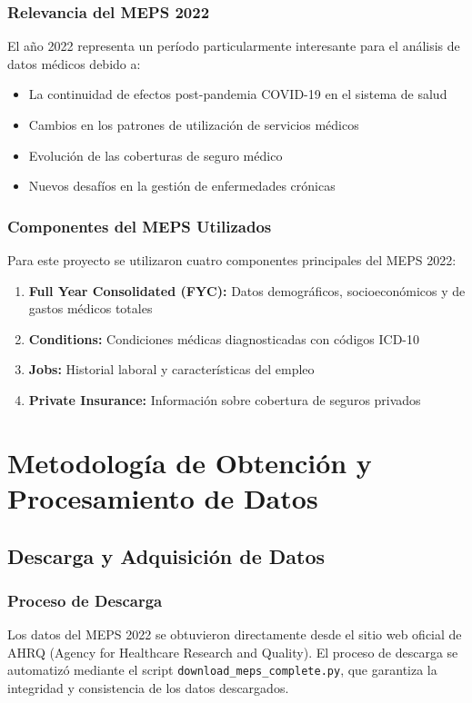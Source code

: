 \documentclass[12pt,a4paper]{article}
\begin{document}
\subsubsection{Relevancia del MEPS 2022}
El año 2022 representa un período particularmente interesante para el análisis de datos médicos debido a:
\begin{itemize}
    \item La continuidad de efectos post-pandemia COVID-19 en el sistema de salud
    \item Cambios en los patrones de utilización de servicios médicos
    \item Evolución de las coberturas de seguro médico
    \item Nuevos desafíos en la gestión de enfermedades crónicas
\end{itemize}

\subsubsection{Componentes del MEPS Utilizados}
Para este proyecto se utilizaron cuatro componentes principales del MEPS 2022:
\begin{enumerate}
    \item \textbf{Full Year Consolidated (FYC):} Datos demográficos, socioeconómicos y de gastos médicos totales
    \item \textbf{Conditions:} Condiciones médicas diagnosticadas con códigos ICD-10
    \item \textbf{Jobs:} Historial laboral y características del empleo
    \item \textbf{Private Insurance:} Información sobre cobertura de seguros privados
\end{enumerate}

\section{Metodología de Obtención y Procesamiento de Datos}

\subsection{Descarga y Adquisición de Datos}

\subsubsection{Proceso de Descarga}
Los datos del MEPS 2022 se obtuvieron directamente desde el sitio web oficial de AHRQ (Agency for Healthcare Research and Quality). El proceso de descarga se automatizó mediante el script \texttt{download\_meps\_complete.py}, que garantiza la integridad y consistencia de los datos descargados.
\end{document}

